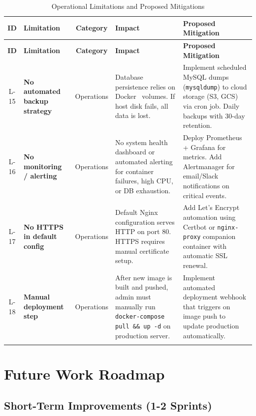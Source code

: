 \begingroup
\small
\renewcommand{\arraystretch}{1.3}
\begin{longtable}{|c|p{2.5cm}|c|p{3.5cm}|p{4.5cm}|}
    \hline
    \textbf{ID} & \textbf{Limitation} & \textbf{Category} & \textbf{Impact} & \textbf{Proposed Mitigation} \\
    \hline
    \endfirsthead
    \hline
    \textbf{ID} & \textbf{Limitation} & \textbf{Category} & \textbf{Impact} & \textbf{Proposed Mitigation} \\
    \hline
    \endhead
    \hline
    \endfoot
    L-15 & \textbf{No automated backup strategy} & Operations & Database persistence relies on Docker~\cite{docker} volumes. If host disk fails, all data is lost. & Implement scheduled MySQL dumps (\texttt{mysqldump}) to cloud storage (S3, GCS) via cron job. Daily backups with 30-day retention. \\
    \hline
    L-16 & \textbf{No monitoring / alerting} & Operations & No system health dashboard or automated alerting for container failures, high CPU, or DB exhaustion. & Deploy Prometheus + Grafana for metrics. Add Alertmanager for email/Slack notifications on critical events. \\
    \hline
    L-17 & \textbf{No HTTPS in default config} & Operations & Default Nginx configuration serves HTTP on port 80. HTTPS requires manual certificate setup. & Add Let's Encrypt automation using Certbot or \texttt{nginx-proxy} companion container with automatic SSL renewal. \\
    \hline
    L-18 & \textbf{Manual deployment step} & Operations & After new image is built and pushed, admin must manually run \texttt{docker-compose pull \&\& up -d} on production server. & Implement automated deployment webhook that triggers on image push to update production automatically. \\
    \hline
    \caption{Operational Limitations and Proposed Mitigations}
    \label{tab:ops-limitations}
\end{longtable}
\endgroup

\section{Future Work Roadmap}
\label{sec:future-work}

\subsection{Short-Term Improvements (1-2 Sprints)}

